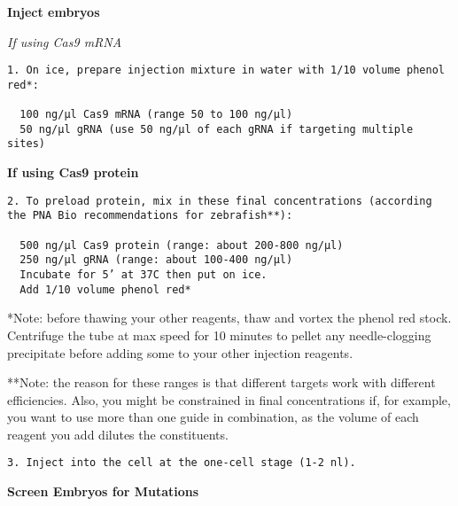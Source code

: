 \documentclass[
  letterpaper,
  DIV=11,
  numbers=noendperiod]{scrreprt}
\begin{document}
\textbf{Inject embryos}

\emph{If using Cas9 mRNA}

\begin{verbatim}
1. On ice, prepare injection mixture in water with 1/10 volume phenol red*: 
  
  100 ng/µl Cas9 mRNA (range 50 to 100 ng/µl) 
  50 ng/µl gRNA (use 50 ng/µl of each gRNA if targeting multiple sites) 
\end{verbatim}

\textbf{If using Cas9 protein}

\begin{verbatim}
2. To preload protein, mix in these final concentrations (according the PNA Bio recommendations for zebrafish**): 
  
  500 ng/µl Cas9 protein (range: about 200-800 ng/µl) 
  250 ng/µl gRNA (range: about 100-400 ng/µl) 
  Incubate for 5’ at 37C then put on ice. 
  Add 1/10 volume phenol red* 
\end{verbatim}

\begin{tcolorbox}[enhanced jigsaw, toprule=.15mm, breakable, coltitle=black, leftrule=.75mm, title=\textcolor{quarto-callout-note-color}{\faInfo}\hspace{0.5em}{Notes}, bottomrule=.15mm, toptitle=1mm, bottomtitle=1mm, colframe=quarto-callout-note-color-frame, opacityback=0, colback=white, opacitybacktitle=0.6, colbacktitle=quarto-callout-note-color!10!white, rightrule=.15mm, titlerule=0mm, arc=.35mm, left=2mm]

*Note: before thawing your other reagents, thaw and vortex the phenol
red stock. Centrifuge the tube at max speed for 10 minutes to pellet any
needle-clogging precipitate before adding some to your other injection
reagents.

**Note: the reason for these ranges is that different targets work with
different efficiencies. Also, you might be constrained in final
concentrations if, for example, you want to use more than one guide in
combination, as the volume of each reagent you add dilutes the
constituents.

\end{tcolorbox}

\begin{verbatim}
3. Inject into the cell at the one-cell stage (1-2 nl). 
\end{verbatim}

\textbf{Screen Embryos for Mutations}
\end{document}
